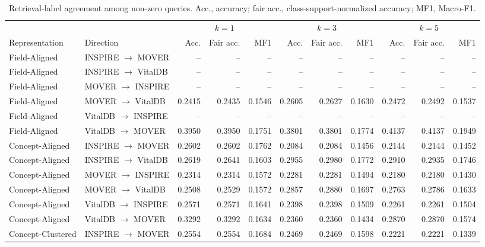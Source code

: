 \begin{table}[!t]
\caption{Retrieval-label agreement among non-zero queries. Acc., accuracy; fair acc., class-support-normalized accuracy; MF1, Macro-F1.}
\label{tab:knn-metrics-full}
\centering\footnotesize
\setlength{\tabcolsep}{1.8pt}
\begin{tabular}{llrrrrrrrrr}
\toprule
& & \multicolumn{3}{c}{$k=1$} & \multicolumn{3}{c}{$k=3$} & \multicolumn{3}{c}{$k=5$}\\
\cmidrule(lr){3-5}\cmidrule(lr){6-8}\cmidrule(lr){9-11}
Representation & Direction & Acc. & Fair acc. & MF1 & Acc. & Fair acc. & MF1 & Acc. & Fair acc. & MF1 \\
\midrule
Field-Aligned & INSPIRE $\rightarrow$ MOVER & -- & -- & -- & -- & -- & -- & -- & -- & -- \\
Field-Aligned & INSPIRE $\rightarrow$ VitalDB & -- & -- & -- & -- & -- & -- & -- & -- & -- \\
Field-Aligned & MOVER $\rightarrow$ INSPIRE & -- & -- & -- & -- & -- & -- & -- & -- & -- \\
Field-Aligned & MOVER $\rightarrow$ VitalDB & 0.2415 & 0.2435 & 0.1546 & 0.2605 & 0.2627 & 0.1630 & 0.2472 & 0.2492 & 0.1537 \\
Field-Aligned & VitalDB $\rightarrow$ INSPIRE & -- & -- & -- & -- & -- & -- & -- & -- & -- \\
Field-Aligned & VitalDB $\rightarrow$ MOVER & 0.3950 & 0.3950 & 0.1751 & 0.3801 & 0.3801 & 0.1774 & 0.4137 & 0.4137 & 0.1949 \\
Concept-Aligned & INSPIRE $\rightarrow$ MOVER & 0.2602 & 0.2602 & 0.1762 & 0.2084 & 0.2084 & 0.1456 & 0.2144 & 0.2144 & 0.1452 \\
Concept-Aligned & INSPIRE $\rightarrow$ VitalDB & 0.2619 & 0.2641 & 0.1603 & 0.2955 & 0.2980 & 0.1772 & 0.2910 & 0.2935 & 0.1746 \\
Concept-Aligned & MOVER $\rightarrow$ INSPIRE & 0.2314 & 0.2314 & 0.1572 & 0.2281 & 0.2281 & 0.1494 & 0.2180 & 0.2180 & 0.1430 \\
Concept-Aligned & MOVER $\rightarrow$ VitalDB & 0.2508 & 0.2529 & 0.1572 & 0.2857 & 0.2880 & 0.1697 & 0.2763 & 0.2786 & 0.1633 \\
Concept-Aligned & VitalDB $\rightarrow$ INSPIRE & 0.2571 & 0.2571 & 0.1641 & 0.2398 & 0.2398 & 0.1509 & 0.2261 & 0.2261 & 0.1504 \\
Concept-Aligned & VitalDB $\rightarrow$ MOVER & 0.3292 & 0.3292 & 0.1634 & 0.2360 & 0.2360 & 0.1434 & 0.2870 & 0.2870 & 0.1574 \\
Concept-Clustered & INSPIRE $\rightarrow$ MOVER & 0.2554 & 0.2554 & 0.1684 & 0.2469 & 0.2469 & 0.1598 & 0.2221 & 0.2221 & 0.1339 \\

\end{tabular}
\end{table}
